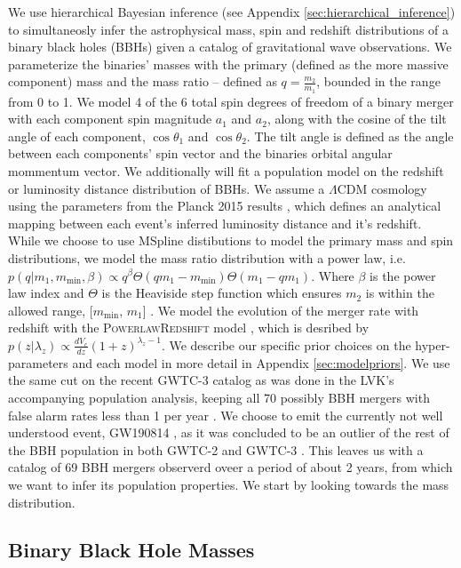 We use hierarchical Bayesian inference (see Appendix \ref{sec:hierarchical_inference}) to simultaneosly infer the astrophysical mass, spin and redshift distributions of 
a binary black holes (BBHs) given a catalog of gravitational wave observations. We parameterize the binaries' masses with the primary (defined as the more massive component) mass 
and the mass ratio -- defined as $q=\frac{m_2}{m_1}$, bounded in the range from 0 to 1. We model 4 of the 6 total 
spin degrees of freedom of a binary merger with each component spin magnitude $a_1$ and $a_2$, along with the cosine of the tilt angle of each component, 
$\cos{\theta_1}$ and $\cos{\theta_2}$. The tilt angle is defined as the angle between each components' spin vector and the binaries orbital angular mommentum vector. 
We additionally will fit a population model on the redshift or luminosity distance distribution of BBHs. We assume a $\Lambda\mathrm{CDM}$ cosmology using the 
parameters from the Planck 2015 results \cite{Planck2015}, which defines an analytical mapping between each event's inferred
luminosity distance and it's redshift. While we choose to use MSpline distibutions to model the primary mass and spin distributions, we 
model the mass ratio distribution with a power law, i.e. $p(q | m_1, m_\mathrm{min}, \beta) \propto q^{\beta} \Theta(qm_1 - m_\mathrm{min}) \Theta(m_1 - qm_1)$. 
Where $\beta$ is the power law index and $\Theta$ is the Heaviside step function which ensures $m_2$ is within the allowed range, [$m_\mathrm{min}$, $m_1$] \cite{Talbot_2018,o1o2_pop,o3a_pop}.
We model the evolution of the merger rate with redshift with the \textsc{PowerlawRedshift} model \cite{Fishbach_2018redshift}, which is desribed by 
$p(z|\lambda_z)\propto \frac{dV_c}{dz}(1+z)^{\lambda_z-1}$. We describe our specific prior choices on the hyper-parameters and each model 
in more detail in Appendix \ref{sec:modelpriors}. We use the same cut on the recent GWTC-3 catalog as was done in the LVK's accompanying population analysis, 
keeping all 70 possibly BBH mergers with false alarm rates less than 1 per year \cite{GWTC3,o3b_astro_dist}. We choose to emit the currently not well understood event, 
GW190814 \cite{190814disc}, as it was concluded to be an outlier of the rest of the BBH population in both GWTC-2 and GWTC-3 \cite{o3a_pop,o3b_astro_dist,Essick_2022}. 
This leaves us with a catalog of 69 BBH mergers observerd oveer a period of about 2 years, from which we want to infer its population properties. 
We start by looking towards the mass distribution.

\subsection{Binary Black Hole Masses} \label{sec:mass_dist}


